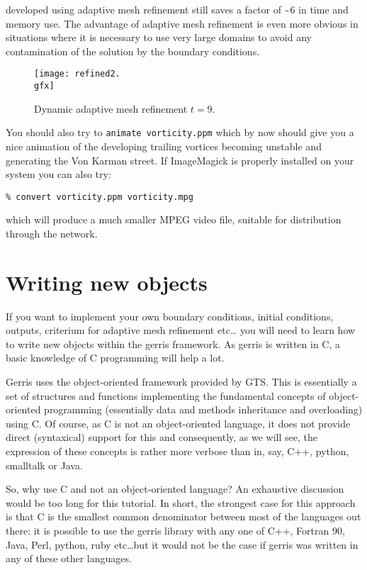 \documentclass[a4paper]{article}
\begin{document}
developed using adaptive mesh refinement still saves a factor of \~{}6 in
time and memory use. The advantage of adaptive mesh refinement is even
more obvious in situations where it is necessary to use very large
domains to avoid any contamination of the solution by the boundary
conditions.
\begin{figure}[htbp]
\begin{center}
\texttt{[image: refined2.\\gfx]}
\end{center}
\caption{Dynamic adaptive mesh refinement $t=9$.}
\label{refined2}
\end{figure}
You should also try to {\tt animate vorticity.ppm} which by now should 
give you a nice animation of the developing trailing vortices becoming 
unstable and generating the Von Karman street. If ImageMagick is
properly installed on your system you can also try:
\begin{verbatim}
% convert vorticity.ppm vorticity.mpg
\end{verbatim}
which will produce a much smaller {\sc MPEG} video file, suitable for
distribution through the network.

\section{Writing new objects}

If you want to implement your own boundary conditions, initial
conditions, outputs, criterium for adaptive mesh refinement etc\dots
you will need to learn how to write new objects within the gerris
framework. As gerris is written in C, a basic knowledge of C
programming will help a lot.

Gerris uses the object-oriented framework provided by {\sc GTS}. This is
essentially a set of structures and functions implementing the
fundamental concepts of object-oriented programming (essentially data
and methods inheritance and overloading) using C. Of course, as C is
not an object-oriented language, it does not provide direct
(syntaxical) support for this and consequently, as we will see, the
expression of these concepts is rather more verbose than in, say, C++,
python, smalltalk or Java.

So, why use C and not an object-oriented language? An exhaustive
discussion would be too long for this tutorial. In short, the
strongest case for this approach is that C is the smallest common
denominator between most of the languages out there: it is possible to
use the gerris library with any one of C++, Fortran 90, Java, Perl,
python, ruby etc\dots but it would not be the case if gerris was written
in any of these other languages.
\end{document}
